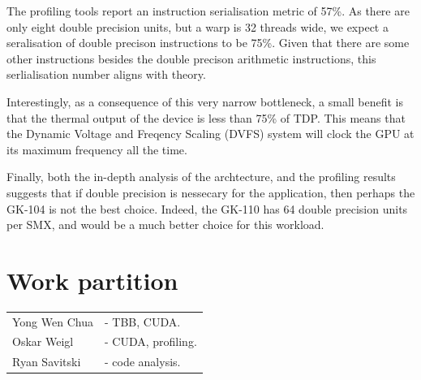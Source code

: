 \documentclass[11pt, oneside, a4paper]{article}
\begin{document}
The profiling tools report an instruction serialisation metric of 57\%. As there are only eight double precision units, but a warp is 32 threads wide, we expect a seralisation of double precison instructions to be 75\%. Given that there are some other instructions besides the double precison arithmetic instructions, this serlialisation number aligns with theory.

Interestingly, as a consequence of this very narrow bottleneck, a small benefit is that the thermal output of the device is less than 75\% of TDP. This means that the Dynamic Voltage and Freqency Scaling (DVFS) system will clock the GPU at its maximum frequency all the time.

Finally, both the in-depth analysis of the archtecture, and the profiling results suggests that if double precision is nessecary for the application, then perhaps the GK-104 is not the best choice. Indeed, the GK-110 has 64 double precision units per SMX, and would be a much better choice for this workload.




\section{Work partition} %
\label{sec:work_partition}
\begin{tabular}{ l l  }
Yong Wen Chua & - TBB, CUDA. \\
Oskar Weigl & - CUDA, profiling. \\
Ryan Savitski & - code analysis. \\
\end{tabular}
\end{document}
